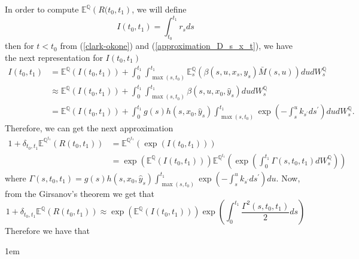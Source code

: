 \documentclass[a4paper,10pt]{article}
\newcommand{\1}{\mathbf{1}}
\begin{document}
In order to compute $\mathbb{E}^{\mathbb{Q}}\left(R(t_0,t_1\right)$, we will define
\begin{equation*}
I(t_0,t_1) = \int_{t_0}^{t_1} r_s ds
\end{equation*}
then for $t < t_0$ from (\ref{clark-okone}) and (\ref{approximation_D_s_x_t}), we have the next representation for $I(t_0,t_1)$
\begin{align}\label{apprx_I_t0_t1}
I(t_0,t_1) &= \mathbb{E}^{\mathbb{Q}}\left(I(t_0,t_1)\right) + \int_{0}^{t_1}\int_{\max(s, t_{0})}^{t_1}  \mathbb{E}_s^{\mathbb{Q}}\left(\beta(s,u,x_s,y_s) \bar{M}(s,u) \right) du dW_s^{\mathbb{Q}} \nonumber \\
&\approx \mathbb{E}^{\mathbb{Q}}\left(I(t_0,t_1)\right) + \int_{0}^{t_1}\int_{\max(s, t_{0})}^{t_1} \beta(s,u,x_0,\hat{y}_s) du dW_s^{\mathbb{Q}}\nonumber \\
&= \mathbb{E}^{\mathbb{Q}}\left(I(t_0,t_1)\right) + \int_{0}^{t_1} g(s)h(s,x_0,\hat{y}_s)\int_{\max(s, t_{0})}^{t_1} \exp\left( -\int_{s}^{u} k_{s^{\prime}} ds^{\prime}\right) du dW_s^{\mathbb{Q}}.
\end{align}
Therefore, we can get the next approximation
\begin{align*}
1 + \delta_{t_0,t_1}\mathbb{E}^{\mathbb{Q}^{t_1}}\left(R(t_0,t_1)\right) &= \mathbb{E}^{\mathbb{Q}^{t_1}}\left( \exp(I(t_0,t_1)) \right)\\
&= \exp\left(\mathbb{E}^{\mathbb{Q}}\left(I(t_0,t_1)\right)\right)  \mathbb{E}^{\mathbb{Q}^{t_1}}\left(\exp\left(\int_{0}^{t_1} \Gamma(s,t_0,t_1)dW_s^{\mathbb{Q}}\right)\right)
\end{align*}
where $\Gamma(s,t_0,t_1)= g(s)h(s,x_0,\hat{y}_s)\int_{\max(s, t_{0})}^{t_1} \exp\left( -\int_{s}^{u} k_{s^{\prime}} ds^{\prime}\right)du$. Now, from the Girsanov's theorem we get that
\begin{equation*}
1 + \delta_{t_0,t_1}\mathbb{E}^{\mathbb{Q}}\left(R(t_0,t_1)\right) \approx \exp\left(\mathbb{E}^{\mathbb{Q}}\left(I(t_0,t_1)\right)\right)\exp\left(\int_{0}^{t_1}\frac{\Gamma^{2}(s,t_0,t_1)}{2} ds\right)
\end{equation*}
Therefore we have that

\hspace{2cm}
\fboxsep1em
\end{document}
